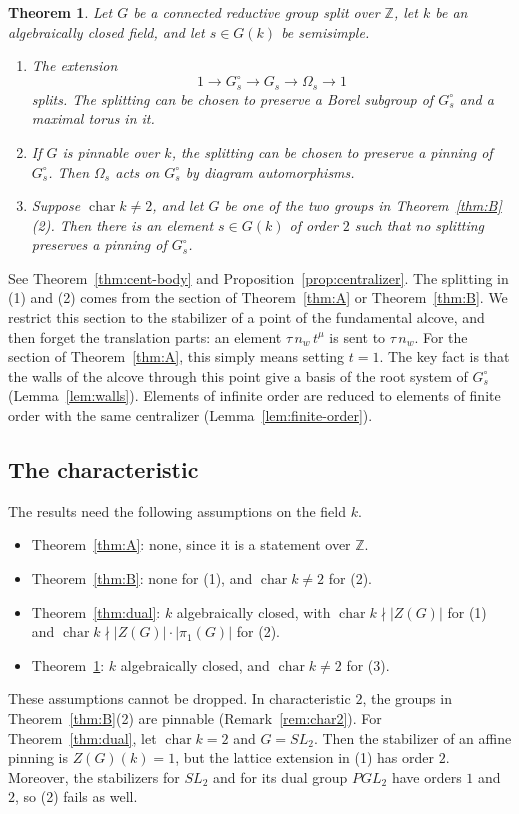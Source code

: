 \documentclass[psamsfonts]{amsart}
\theoremstyle{definition}
\theoremstyle{remark}
\numberwithin{equation}{section}
\newcommand{\Z}{\mathbb{Z}}   %
\newcommand{\ra}{\rightarrow}
\DeclareMathOperator{\chara}{char}
\numberwithin{equation}{section}
\newcommand{\Om}{\Omega}
\theoremstyle{plain}
\newtheorem{introthm}{Theorem}
\begin{document}
\begin{introthm}\label{thm:cent}
Let $G$ be a connected reductive group split over $\Z$, let $k$ be an algebraically closed field, and let $s\in G(k)$ be semisimple.
\begin{enumerate}[(1)]
\item The extension
\[
1\ra G_s^{\circ}\ra G_s\ra\Om_s\ra 1
\]
splits. The splitting can be chosen to preserve a Borel subgroup of $G_s^{\circ}$ and a maximal torus in it.
\item If $G$ is pinnable over $k$, the splitting can be chosen to preserve a pinning of $G_s^{\circ}$. Then $\Om_s$ acts on $G_s^{\circ}$ by diagram automorphisms.
\item Suppose $\chara k\neq 2$, and let $G$ be one of the two groups in Theorem~\ref{thm:B}(2). Then there is an element $s\in G(k)$ of order $2$ such that no splitting preserves a pinning of $G_s^{\circ}$.
\end{enumerate}
\end{introthm}

See Theorem~\ref{thm:cent-body} and Proposition~\ref{prop:centralizer}. The splitting in (1) and (2) comes from the section of Theorem~\ref{thm:A} or Theorem~\ref{thm:B}. We restrict this section to the stabilizer of a point of the fundamental alcove, and then forget the translation parts: an element $\tau\,n_w\,t^{\mu}$ is sent to $\tau\,n_w$. For the section of Theorem~\ref{thm:A}, this simply means setting $t=1$. The key fact is that the walls of the alcove through this point give a basis of the root system of $G_s^{\circ}$ (Lemma~\ref{lem:walls}). Elements of infinite order are reduced to elements of finite order with the same centralizer (Lemma~\ref{lem:finite-order}).

\subsection*{The characteristic}
The results need the following assumptions on the field $k$.
\begin{itemize}
\item Theorem~\ref{thm:A}: none, since it is a statement over $\Z$.
\item Theorem~\ref{thm:B}: none for (1), and $\chara k\neq2$ for (2).
\item Theorem~\ref{thm:dual}: $k$ algebraically closed, with $\chara k\nmid|Z(G)|$ for (1) and $\chara k\nmid|Z(G)|\cdot|\pi_1(G)|$ for (2).
\item Theorem~\ref{thm:cent}: $k$ algebraically closed, and $\chara k\neq2$ for (3).
\end{itemize}
These assumptions cannot be dropped. In characteristic $2$, the groups in Theorem~\ref{thm:B}(2) are pinnable (Remark~\ref{rem:char2}). For Theorem~\ref{thm:dual}, let $\chara k=2$ and $G=SL_2$. Then the stabilizer of an affine pinning is $Z(G)(k)=1$, but the lattice extension in (1) has order $2$. Moreover, the stabilizers for $SL_2$ and for its dual group $PGL_2$ have orders $1$ and $2$, so (2) fails as well.
\end{document}
